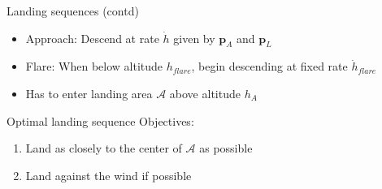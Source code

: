 \documentclass{beamer}
\renewcommand{\vec}[1]{
    \boldsymbol{#1}
}
\begin{document}
\begin{frame}{Landing sequences (contd)}
    \begin{itemize}
        \item Approach: Descend at rate $\dot{h}$ given by $\vec{p}_A$ and $\vec{p}_L$
        \item Flare: When below altitude $h_{flare}$, begin descending at fixed rate $\dot{h}_{flare}$
        \item Has to enter landing area $\mathcal{A}$ above altitude $h_A$
    \end{itemize}
\end{frame}

\begin{frame}{Optimal landing sequence}
    Objectives:
    \begin{enumerate}
        \item Land as closely to the center of $\mathcal{A}$ as possible
        \item Land against the wind if possible
    \end{enumerate}
\end{frame}
\end{document}

